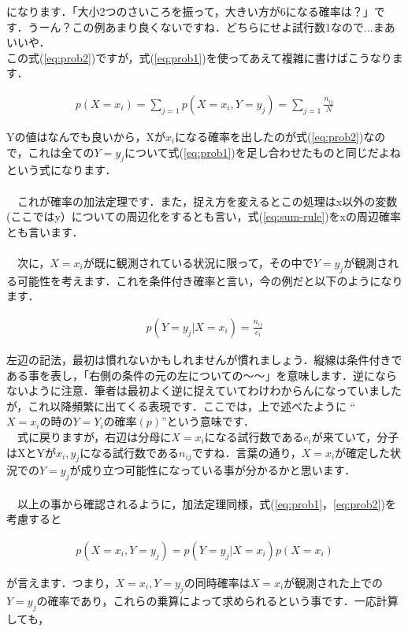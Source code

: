 \documentclass[11pt,a4paper,uplatex]{ujreport} 	%
\begin{document}
になります．「大小2つのさいころを振って，大きい方が6になる確率は？」です．うーん？この例あまり良くないですね．どちらにせよ試行数1なので...まあいいや．\\

この式(\ref{eq:prob2})ですが，式(\ref{eq:prob1})を使ってあえて複雑に書けばこうなります．

\begin{align}
\label{eq:sum-rule}
p(X=x_i) = \sum_{j=1} p(X=x_i, Y=y_j) = \sum_{j=1} \frac{n_{ij}}{N}
\end{align}

Yの値はなんでも良いから，Xが$x_i$になる確率を出したのが式(\ref{eq:prob2})なので，これは全ての$Y=y_j$について式(\ref{eq:prob1})を足し合わせたものと同じだよねという式になります．\\
\\
　これが確率の加法定理です．また，捉え方を変えるとこの処理はx以外の変数(ここではy）についての周辺化をするとも言い，式(\ref{eq:sum-rule})をxの周辺確率とも言います．\\
\\
　次に，$X=x_i$が既に観測されている状況に限って，その中で$Y=y_j$が観測される可能性を考えます．これを条件付き確率と言い，今の例だと以下のようになります．

\begin{align}
\label{eq:conditional}
p(Y=y_j | X=x_i) = \frac{n_{ij}}{c_i}
\end{align}

左辺の記法，最初は慣れないかもしれませんが慣れましょう．縦線は条件付きである事を表し，「右側の条件の元の左についての～～」を意味します．逆にならないように注意．筆者は最初よく逆に捉えていてわけわからんになっていましたが，これ以降頻繁に出てくる表現です．ここでは，上で述べたように ``$X=x_iの時のY=Y_iの確率(p)$''という意味です．\\
　式に戻りますが，右辺は分母に$X=x_i$になる試行数である$c_i$が来ていて，分子はXとYが$x_i, y_j$になる試行数である$n_{ij}$ですね．言葉の通り，$X=x_i$が確定した状況での$Y=y_j$が成り立つ可能性になっている事が分かるかと思います．\\
\\
　以上の事から確認されるように，加法定理同様，式(\ref{eq:prob1}，\ref{eq:prob2})を考慮すると

\begin{align}
p(X=x_i , Y=y_j) = p(Y=y_j | X=x_i)p(X=x_i)
\label{eq:product}
\end{align}

が言えます．つまり，$X=x_i , Y=y_j$の同時確率は$X=x_i$が観測された上での$Y=y_j$の確率であり，これらの乗算によって求められるという事です．一応計算しても，
\end{document}
